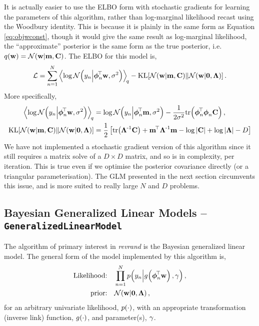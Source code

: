 \documentclass[11pt, oneside]{article}
\begin{document}
It is actually easier to use the ELBO form with stochastic gradients for
learning the parameters of this algorithm, rather than log-marginal likelihood
recast using the Woodbury identity.  This is because it is plainly in the same
form as Equation \eqref{eq:objwconst}, though it would give the same result as
log-marginal likelihood, the ``approximate'' posterior is the same form as the
true posterior, i.e.\ $q\!\left({\mathbf{w}}\right) = \mathcal{N}\!\left({\mathbf{w}}\middle\vert{\ensuremath{\mathbf{m}}, \ensuremath{\mathbf{C}}}\right)$.
The ELBO for this model is,
\begin{equation}
    \elbo = \sum^N_{n=1} 
    \expec{q}{\log\gausC{\targs_n}{\feats_n\T\weights, \var}}
    - \KL{\gausC{\weights}{\pomean, \pocov}}
        {\gausC{\weights}{\mathbf{0}, \Reg}}.
    \label{eq:slmobj}
\end{equation}
More specifically,
\begin{align*}
    \expec{q}{\log\gausC{\targs_n}{\feats_n\T\weights, \var}} &=
    \log \gausC{\targs_n}{\feats_n\T\pomean, \var}
    - \frac{1}{2 \var} \trace{\feats_n\T\feats_n\pocov}, \\
    \KL{\gausC{\weights}{\pomean, \pocov}}
        {\gausC{\weights}{\mathbf{0}, \Reg}} &=
        \frac{1}{2} \sbrac{\trace{\Reg\inv\pocov} + \pomean\T\Reg\inv\pomean 
        -  \log\deter{\pocov} + \log\deter{\Reg} - D}
\end{align*}
We have not implemented a stochastic gradient version of this algorithm since
it still requires a matrix solve of a $D \times D$ matrix, and so is 
in complexity, per iteration. This is true even if we optimise the posterior
covariance directly (or a triangular parameterisation). The GLM presented in
the next section circumvents this issue, and is more suited to really large $N$
and $D$ problems.


\subsection{Bayesian Generalized Linear Models --
    \texttt{GeneralizedLinearModel}}

The algorithm of primary interest in \emph{revrand} is the Bayesian generalized
linear model. The general form of the model implemented by this algorithm is,
\begin{align}
    \text{Likelihood:} \quad &\prod^N_{n=1} 
        p\!\left({y_n}\middle\vert{\ensuremath{{g}_{}\!\left({{\boldsymbol\phi_n^{\!\top}\mathbf{w}}}\right)}, \ensuremath{\gamma}}\right), 
        \label{eq:glmlike} \\
    \text{prior:} \quad &\mathcal{N}\!\left({\mathbf{w}}\middle\vert{\mathbf{0}, \ensuremath{\boldsymbol{\Lambda}}}\right),
\end{align}
for an arbitrary univariate likelihood, $p\!\left({\cdot}\right)$, with an appropriate
transformation (inverse link) function, ${g}_{}\!\left({{\cdot}}\right)$, and parameter(s),
$\gamma$. 
\end{document}

